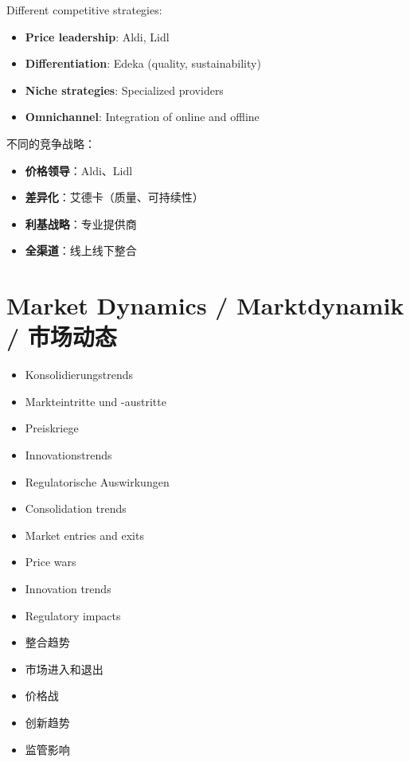 Different competitive strategies:
\begin{itemize}
    \item \textbf{Price leadership}: Aldi, Lidl
    \item \textbf{Differentiation}: Edeka (quality, sustainability)
    \item \textbf{Niche strategies}: Specialized providers
    \item \textbf{Omnichannel}: Integration of online and offline
\end{itemize}

不同的竞争战略：
\begin{itemize}
    \item \textbf{价格领导}：Aldi、Lidl
    \item \textbf{差异化}：艾德卡（质量、可持续性）
    \item \textbf{利基战略}：专业提供商
    \item \textbf{全渠道}：线上线下整合
\end{itemize}

\section{Market Dynamics / Marktdynamik / 市场动态}

\begin{otherlanguage}{ngerman}
\begin{itemize}
    \item Konsolidierungstrends
    \item Markteintritte und -austritte
    \item Preiskriege
    \item Innovationstrends
    \item Regulatorische Auswirkungen
\end{itemize}
\end{otherlanguage}

\begin{itemize}
    \item Consolidation trends
    \item Market entries and exits
    \item Price wars
    \item Innovation trends
    \item Regulatory impacts
\end{itemize}

\begin{itemize}
    \item 整合趋势
    \item 市场进入和退出
    \item 价格战
    \item 创新趋势
    \item 监管影响
\end{itemize}

